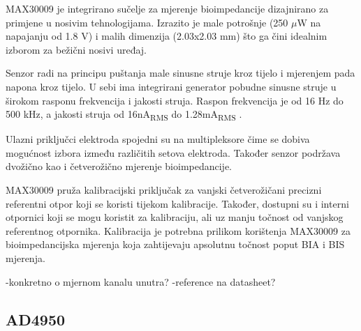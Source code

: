\documentclass[../diplomski_rad.tex]{subfiles}
\begin{document}
MAX30009 je integrirano sučelje za mjerenje bioimpedancije dizajnirano za primjene u nosivim tehnologijama. 
Izrazito je male potrošnje (250 $\mu$W na napajanju od 1.8 V)\cite{max30009} i malih dimenzija (2.03x2.03 mm) što ga čini idealnim izborom za bežični nosivi uređaj.  

Senzor radi na principu puštanja male sinusne struje kroz tijelo i mjerenjem pada napona kroz tijelo. 
U sebi ima integrirani generator pobudne sinusne struje u širokom rasponu frekvencija i jakosti struja. 
Raspon frekvencija je od 16 Hz do 500 kHz, a jakosti struja od 16nA\textsubscript{RMS} do 1.28mA\textsubscript{RMS} \cite{max30009}.

Ulazni priključci elektroda spojedni su na multipleksore čime se dobiva mogućnost izbora 
između različitih setova elektroda. Također senzor podržava dvožično kao i četverožično mjerenje bioimpedancije.

MAX30009 pruža kalibracijski priključak za vanjski četverožičani precizni referentni otpor koji se koristi tijekom kalibracije. 
Također, dostupni su i interni otpornici koji se mogu koristit za kalibraciju, ali uz manju točnost od vanjskog referentnog otpornika.
Kalibracija je potrebna prilikom korištenja MAX30009 za bioimpedancijska mjerenja koja zahtijevaju apsolutnu točnost poput BIA i BIS mjerenja.

-konkretno o mjernom kanalu unutra?
-reference na datasheet?

\subsection{AD4950}
\end{document}
